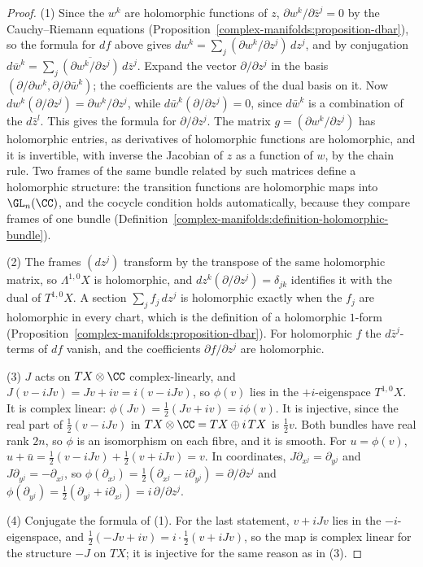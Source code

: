 \begin{proof}
(1) Since the $w^k$ are holomorphic functions of $z$, $\partial w^k/\partial\bar z^j = 0$ by the Cauchy--Riemann equations (Proposition~\ref{complex-manifolds:proposition-dbar}), so the formula for $df$ above gives
$dw^k = \sum_j(\partial w^k/\partial z^j)\,dz^j$, and by conjugation $d\bar w^k = \sum_j\overline{(\partial w^k/\partial z^j)}\,d\bar z^j$. Expand the vector $\partial/\partial z^j$ in the basis
$(\partial/\partial w^k, \partial/\partial\bar w^k)$; the coefficients are the values of the dual basis on it. Now $dw^k(\partial/\partial z^j) = \partial w^k/\partial z^j$, while $d\bar w^k(\partial/\partial z^j) = 0$, since
$d\bar w^k$ is a combination of the $d\bar z^l$. This gives the formula for $\partial/\partial z^j$. The matrix $g = (\partial w^k/\partial z^j)$ has holomorphic entries, as derivatives of holomorphic functions are
holomorphic, and it is invertible, with inverse the Jacobian of $z$ as a function of $w$, by the chain rule. Two frames of the same bundle related by such matrices define a holomorphic structure: the transition
functions are holomorphic maps into $\GL_n(\CC)$, and the cocycle condition holds automatically, because they compare frames of one bundle (Definition~\ref{complex-manifolds:definition-holomorphic-bundle}).

(2) The frames $(dz^j)$ transform by the transpose of the same holomorphic matrix, so $\Lambda^{1,0}X$ is holomorphic, and $dz^k(\partial/\partial z^j) = \delta_{jk}$ identifies it with the dual of $T^{1,0}X$. A
section $\sum_jf_j\,dz^j$ is holomorphic exactly when the $f_j$ are holomorphic in every chart, which is the definition of a holomorphic $1$-form (Proposition~\ref{complex-manifolds:proposition-dbar}). For holomorphic
$f$ the $d\bar z^j$-terms of $df$ vanish, and the coefficients $\partial f/\partial z^j$ are holomorphic.

(3) $J$ acts on $TX \otimes \CC$ complex-linearly, and $J(v - iJv) = Jv + iv = i(v - iJv)$, so $\phi(v)$ lies in the $+i$-eigenspace $T^{1,0}X$. It is complex linear: $\phi(Jv) = \frac12(Jv + iv) = i\phi(v)$.
It is injective, since the real part of $\frac12(v - iJv)$ in $TX \otimes \CC = TX \oplus i\,TX$ is $\frac12v$. Both bundles have real rank $2n$, so $\phi$ is an isomorphism on each fibre, and it is smooth. For
$u = \phi(v)$, $u + \bar u = \frac12(v - iJv) + \frac12(v + iJv) = v$. In coordinates, $J\partial_{x^j} = \partial_{y^j}$ and $J\partial_{y^j} = -\partial_{x^j}$, so
$\phi(\partial_{x^j}) = \frac12(\partial_{x^j} - i\partial_{y^j}) = \partial/\partial z^j$ and $\phi(\partial_{y^j}) = \frac12(\partial_{y^j} + i\partial_{x^j}) = i\,\partial/\partial z^j$.

(4) Conjugate the formula of (1). For the last statement, $v + iJv$ lies in the $-i$-eigenspace, and $\frac12(-Jv + iv) = i \cdot \frac12(v + iJv)$, so the map is complex linear for the structure $-J$ on $TX$; it is
injective for the same reason as in (3).
\end{proof}


